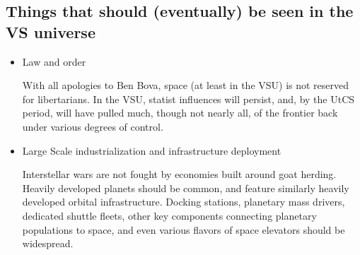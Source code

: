 \subsection{Things that should (eventually) be seen in the VS universe}
\label{subsec:thingsseeninVSU}
\begin{itemize}
\item Law and order

With all apologies to Ben Bova, space (at least in the VSU) is not
reserved for libertarians. In the VSU, statist influences will
persist, and, by the UtCS period, will have pulled much, though not
nearly all, of the frontier back under various degrees of control.

\item Large Scale industrialization and infrastructure deployment

Interstellar wars are not fought by economies built around goat
herding. Heavily developed planets should be common, and feature
similarly heavily developed orbital infrastructure. Docking stations,
planetary mass drivers, dedicated shuttle fleets, other key components
connecting planetary populations to space, and even various flavors of
space elevators should be widespread.

\end{itemize}

